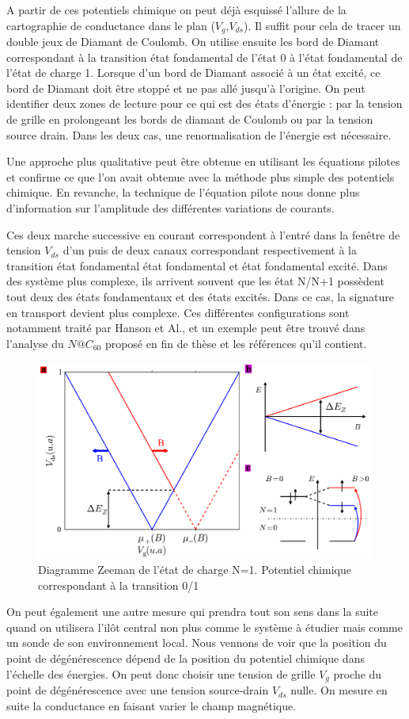 A partir de ces potentiels chimique on peut déjà esquissé l'allure de la cartographie de conductance dans le plan ($V_g$,$V_{ds}$). Il suffit pour cela de tracer un double jeux de Diamant de Coulomb. On utilise ensuite les bord de Diamant correspondant à la transition état fondamental de l'état 0 à l'état fondamental de l'état de charge 1. Lorsque d'un bord de Diamant associé à un état excité, ce bord de Diamant doit \^etre stoppé et ne pas allé jusqu'à l'origine. On peut identifier deux zones de lecture pour ce qui est des états d'énergie : par la tension de grille en prolongeant les bords de diamant de Coulomb ou par la tension source drain. Dans les deux cas, une renormalisation de l'énergie est nécessaire.

Une approche plus qualitative peut \^etre obtenue en utilisant les équations pilotes et confirme ce que l'on avait obtenue avec la méthode plus simple des potentiels chimique. En revanche, la technique de l'équation pilote nous donne plus d'information sur l'amplitude des différentes variations de courants.

Ces deux marche successive en courant correspondent à l'entré dans la fen\^etre de tension $V_{ds}$ d'un puis de deux canaux correspondant respectivement à la transition état fondamental état fondamental et état fondamental excité. Dans des système plus complexe, ils arrivent souvent que les état N/N+1 possèdent tout deux des états fondamentaux et des états excités. Dans ce cas, la signature en transport devient plus complexe. Ces différentes configurations sont notamment traité par Hanson et Al., et un exemple peut \^etre trouvé dans l'analyse du $N@C_{60}$ proposé en fin de thèse et les références qu'il contient.

\begin{figure}
\includegraphics[scale=0.5]{Theorie/Transport/figure4/figure4.pdf} 
\caption{Diagramme Zeeman de l'état de charge N=1. Potentiel chimique correspondant à la transition 0/1}
\label{charge_discharge}
\end{figure}

On peut également une autre mesure qui prendra tout son sens dans la suite quand on utilisera l'il\^ot central non plus comme le système à étudier mais comme un sonde de son environnement local. Nous vennons de voir que la position du point de dégénérescence dépend de la position du potentiel chimique dans l'échelle des énergies. On peut donc choisir une tension de grille $V_g$ proche du point de dégénérescence avec une tension source-drain $V_{ds}$ nulle. On mesure en suite la conductance en faisant varier le champ magnétique.